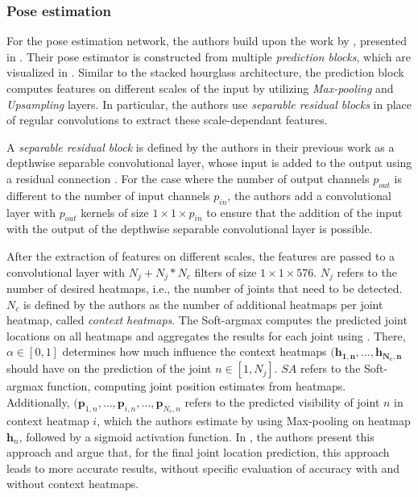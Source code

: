 \subsubsection{Pose estimation}
\label{sec:luvizon_poseestimator}
For the pose estimation network, the authors build upon the work by \cite{newell_stacked_2016}, presented in .
Their pose estimator is constructed from multiple \textit{prediction blocks}, which are visualized in .
Similar to the stacked hourglass architecture, the prediction block computes features on different scales of the input by utilizing \textit{Max-pooling} and \textit{Upsampling} layers.
In particular, the authors use \textit{separable residual blocks} in place of regular convolutions to extract these scale-dependant features.

A \textit{separable residual block} is defined by the authors in their previous work \cite{luvizon_human_2017} as a depthwise separable convolutional layer, whose input is added to the output using a residual connection .
For the case where the number of output channels $p_{out}$ is different to the number of input channels $p_{in}$, the authors add a convolutional layer with $p_{out}$ kernels of size $1 \times 1 \times p_{in}$ to ensure that the addition of the input with the output of the depthwise separable convolutional layer is possible.

After the extraction of features on different scales, the features are passed to a convolutional layer with $N_j + N_j * N_c$ filters of size $1 \times 1 \times 576$.
$N_j$ refers to the number of desired heatmaps, i.e., the number of joints that need to be detected.
$N_c$ is defined by the authors as the number of additional heatmaps per joint heatmap, called \textit{context heatmaps}.
The Soft-argmax computes the predicted joint locations on all heatmaps and aggregates the results for each joint using .
There, $\alpha \in [0,1]$ determines how much influence the context heatmaps $(\bm{h_{1,n}}, \dots, \bm{h_{N_c, n}}$ should have on the prediction of the joint $n \in [1, N_j]$.
$SA$ refers to the Soft-argmax function, computing joint position estimates from heatmaps.
Additionally, $(\bm{p}_{1,n}, \dots, \bm{p}_{i,n}, \dots, \bm{p}_{N_c,n}$ refers to the predicted visibility of joint $n$ in context heatmap $i$, which the authors estimate by using Max-pooling on heatmap $\bm{h}_n$, followed by a sigmoid activation function.
In \cite{luvizon_human_2017}, the authors present this approach and argue that, for the final joint location prediction, this approach leads to more accurate results, without specific evaluation of accuracy with and without context heatmaps.

